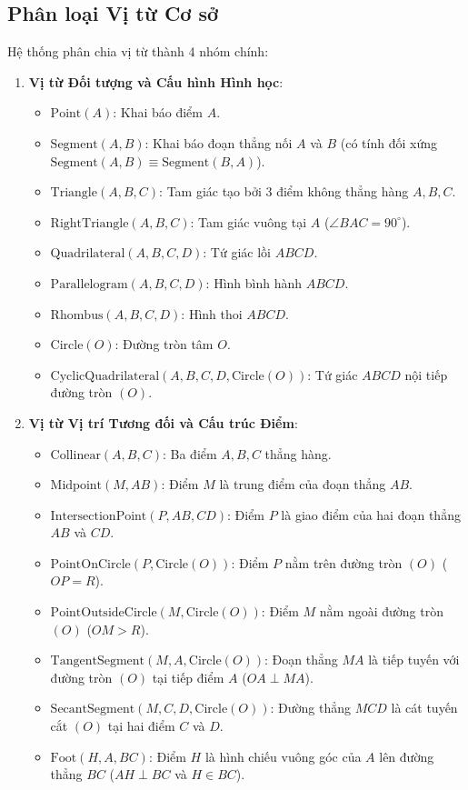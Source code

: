 \subsection{Phân loại Vị từ Cơ sở}
Hệ thống phân chia vị từ thành 4 nhóm chính:
\begin{enumerate}
    \item \textbf{Vị từ Đối tượng và Cấu hình Hình học}:
    \begin{itemize}
        \item $\text{Point}(A)$: Khai báo điểm $A$.
        \item $\text{Segment}(A, B)$: Khai báo đoạn thẳng nối $A$ và $B$ (có tính đối xứng $\text{Segment}(A, B) \equiv \text{Segment}(B, A)$).
        \item $\text{Triangle}(A, B, C)$: Tam giác tạo bởi 3 điểm không thẳng hàng $A, B, C$.
        \item $\text{RightTriangle}(A, B, C)$: Tam giác vuông tại $A$ ($\angle BAC = 90^\circ$).
        \item $\text{Quadrilateral}(A, B, C, D)$: Tứ giác lồi $ABCD$.
        \item $\text{Parallelogram}(A, B, C, D)$: Hình bình hành $ABCD$.
        \item $\text{Rhombus}(A, B, C, D)$: Hình thoi $ABCD$.
        \item $\text{Circle}(O)$: Đường tròn tâm $O$.
        \item $\text{CyclicQuadrilateral}(A, B, C, D, \text{Circle}(O))$: Tứ giác $ABCD$ nội tiếp đường tròn $(O)$.
    \end{itemize}
    
    \item \textbf{Vị từ Vị trí Tương đối và Cấu trúc Điểm}:
    \begin{itemize}
        \item $\text{Collinear}(A, B, C)$: Ba điểm $A, B, C$ thẳng hàng.
        \item $\text{Midpoint}(M, AB)$: Điểm $M$ là trung điểm của đoạn thẳng $AB$.
        \item $\text{IntersectionPoint}(P, AB, CD)$: Điểm $P$ là giao điểm của hai đoạn thẳng $AB$ và $CD$.
        \item $\text{PointOnCircle}(P, \text{Circle}(O))$: Điểm $P$ nằm trên đường tròn $(O)$ ($OP = R$).
        \item $\text{PointOutsideCircle}(M, \text{Circle}(O))$: Điểm $M$ nằm ngoài đường tròn $(O)$ ($OM > R$).
        \item $\text{TangentSegment}(M, A, \text{Circle}(O))$: Đoạn thẳng $MA$ là tiếp tuyến với đường tròn $(O)$ tại tiếp điểm $A$ ($OA \perp MA$).
        \item $\text{SecantSegment}(M, C, D, \text{Circle}(O))$: Đường thẳng $MCD$ là cát tuyến cắt $(O)$ tại hai điểm $C$ và $D$.
        \item $\text{Foot}(H, A, BC)$: Điểm $H$ là hình chiếu vuông góc của $A$ lên đường thẳng $BC$ ($AH \perp BC$ và $H \in BC$).
    \end{itemize}


\end{enumerate}
